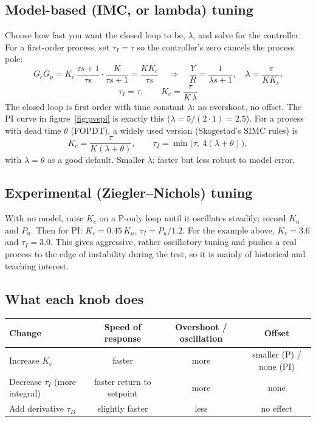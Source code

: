 \documentclass[11pt,a4paper]{article}
\begin{document}
\subsection{Model-based (IMC, or lambda) tuning}
Choose how fast you want the closed loop to be, $\lambda$, and solve for the controller. For a
first-order process, set $\tau_I = \tau$ so the controller's zero cancels the process pole:
\[
  G_c G_p = K_c\,\frac{\tau s + 1}{\tau s}\cdot\frac{K}{\tau s+1} = \frac{K K_c}{\tau s}
  \quad\Longrightarrow\quad
  \frac{Y}{R} = \frac{1}{\lambda s + 1}, \quad \lambda = \frac{\tau}{K K_c}.
\]
\begin{equation}
  \boxed{\,\tau_I = \tau, \qquad K_c = \frac{\tau}{K\,\lambda}\,}
\end{equation}
The closed loop is first order with time constant $\lambda$: no overshoot, no offset. The PI curve in
figure~\ref{fig:pvspi} is exactly this ($\lambda = 5/(2 \cdot 1) = 2.5$). For a process with dead time
$\theta$ (FOPDT), a widely used version (Skogestad's SIMC rules) is
\[
  K_c = \frac{\tau}{K(\lambda + \theta)}, \qquad \tau_I = \min\bigl(\tau,\ 4(\lambda + \theta)\bigr),
\]
with $\lambda = \theta$ as a good default. Smaller $\lambda$: faster but less robust to model error.

\subsection{Experimental (Ziegler--Nichols) tuning}
With no model, raise $K_c$ on a P-only loop until it oscillates steadily; record $K_u$ and $P_u$. Then
for PI: $K_c = 0.45\,K_u$, $\tau_I = P_u/1.2$. For the example above, $K_c = 3.6$ and $\tau_I = 3.0$.
This gives aggressive, rather oscillatory tuning and pushes a real process to the edge of instability
during the test, so it is mainly of historical and teaching interest.

\subsection{What each knob does}
\begin{center}\small
\begin{tabular}{@{}l c c c@{}}
\toprule
Change & Speed of response & Overshoot / oscillation & Offset \\
\midrule
Increase $K_c$ & faster & more & smaller (P) / none (PI) \\
Decrease $\tau_I$ (more integral) & faster return to setpoint & more & none \\
Add derivative $\tau_D$ & slightly faster & less & no effect \\
\bottomrule
\end{tabular}
\end{center}
\end{document}
